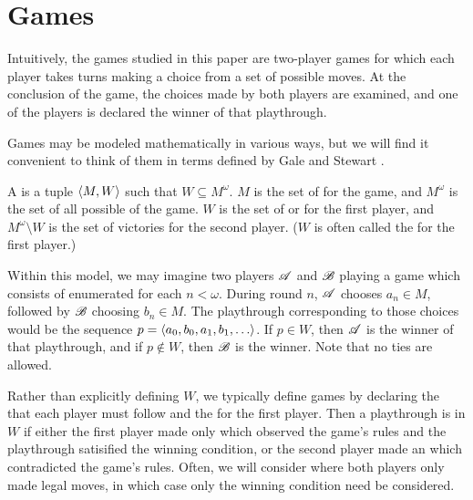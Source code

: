 \section{Games}

Intuitively, the games studied in this paper are two-player games for which
each player takes turns making a choice from a set of possible moves. At
the conclusion of the game, the choices made by both players are examined,
and one of the players is declared the winner of that playthrough.

Games may be modeled mathematically in various ways,
but we will find it convenient to think of them in terms defined by
Gale and Stewart \cite{MR0054922}.

\begin{defn}
  A  is a tuple $\langle M,W\rangle$ such that
  $W\subseteq M^{\omega}$. $M$ is the set of  for
  the game, and $M^{\omega}$ is the set of all possible
   of the game.
  $W$ is the set of  or  for the
  first player, and $M^{\omega}\setminus W$ is the set of victories for the
  second player. ($W$ is often called the  for the
  first player.)
\end{defn}

Within this model, we may imagine two players $\mathscr{A}$ and $\mathscr{B}$ playing a
game which consists of  enumerated for each $n<\omega$.
During round $n$, $\mathscr{A}$ chooses $a_n\in M$, followed by $\mathscr{B}$ choosing
$b_n\in M$. The playthrough corresponding to those choices would be
the sequence $p = \<a_0,b_0,a_1,b_1,\dots\>$. If $p\in W$, then $\mathscr{A}$
is the winner of that playthrough, and if $p\not\in W$, then $\mathscr{B}$ is
the winner. Note that no ties are allowed.

Rather than explicitly defining $W$, we
typically define games by declaring the  that each player must
follow and the  for the first player.
Then a playthrough is in $W$ if either
the first player made only  which observed the game's rules
and the playthrough satisified the winning condition, or the second player
made an  which contradicted the game's rules.
Often, we will consider  where both players only
made legal moves, in which case only the winning condition need be considered.

